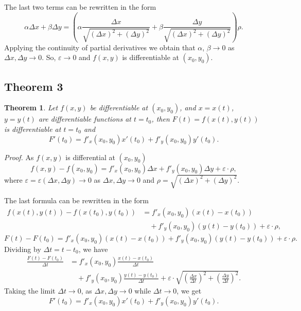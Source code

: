 \documentclass{article}
\newtheorem{theorem}{Theorem}
\begin{document}
The last two terms can be rewritten in the form
\[
\alpha \Delta x + \beta \Delta y = \left(\alpha \frac{\Delta x}{\sqrt{(\Delta x)^2 + (\Delta y)^2}} + \beta \frac{\Delta y}{\sqrt{(\Delta x)^2 + (\Delta y)^2}}\right)\rho.
\]
Applying the continuity of partial derivatives we obtain that $\alpha$, $\beta \to 0$ as $\Delta x, \Delta y \to 0$. So, $\varepsilon \to 0$ and $f(x, y)$ is differentiable at $(x_0, y_0)$.

\subsection*{Theorem 3}

\begin{theorem}
Let $f(x, y)$ be differentiable at $(x_0, y_0)$, and $x = x(t)$, $y = y(t)$ are differentiable functions at $t = t_0$, then $F(t) = f(x(t), y(t))$ is differentiable at $t = t_0$ and
\[
F'(t_0) = f'_x (x_0, y_0)x'(t_0) + f'_y (x_0, y_0)y'(t_0).
\]
\end{theorem}

\vspace{1em}

\textit{Proof.} As $f(x, y)$ is differential at $(x_0, y_0)$
\[
f(x, y) - f(x_0, y_0) = f'_x (x_0, y_0) \Delta x + f'_y (x_0, y_0) \Delta y + \varepsilon \cdot \rho,
\]
where $\varepsilon = \varepsilon (\Delta x, \Delta y) \to 0$ as $\Delta x, \Delta y \to 0$ and $\rho = \sqrt{(\Delta x)^2 + (\Delta y)^2}$.

The last formula can be rewritten in the form
\begin{align}
    f(x(t), y(t)) - f(x(t_0), y(t_0)) &= f'_x (x_0, y_0) (x(t) - x(t_0)) \nonumber \\
    &\quad + f'_y (x_0, y_0) (y(t) - y(t_0)) + \varepsilon \cdot \rho,
    \end{align}
\[
F(t) - F(t_0) = f'_x (x_0, y_0) (x(t) - x(t_0)) + f'_y (x_0, y_0) (y(t) - y(t_0)) + \varepsilon \cdot \rho.
\]
Dividing by $\Delta t = t - t_0$, we have
\begin{align}
    \frac{F(t) - F(t_0)}{\Delta t} &= f'_x (x_0, y_0) \frac{x(t) - x(t_0)}{\Delta t} \nonumber \\
    &\quad + f'_y (x_0, y_0) \frac{y(t) - y(t_0)}{\Delta t} + \varepsilon \cdot \sqrt{\left(\frac{\Delta x}{\Delta t}\right)^2 + \left(\frac{\Delta y}{\Delta t}\right)^2}.
    \end{align}
Taking the limit $\Delta t \to 0$, as $\Delta x, \Delta y \to 0$ while $\Delta t \to 0$, we get
\[
F'(t_0) = f'_x (x_0, y_0)x'(t_0) + f'_y (x_0, y_0)y'(t_0).
\]
\end{document}
